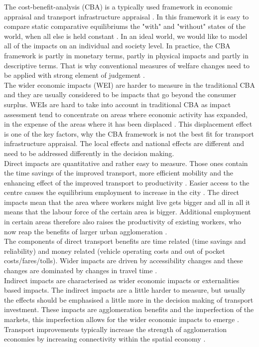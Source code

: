 The cost-benefit-analysis (CBA) is a typically used framework in economic appraisal and transport infrastructure appraisal \citep{venables2007}. In this framework it is easy to compare static comparative equilibriums the "with" and "without" states of the world, when all else is held constant \citep{mackie}. In an ideal world, we would like to model all of the impacts on an individual and society level. In practice, the CBA framework is partly in monetary terms, partly in physical impacts and partly in descriptive terms. That is why conventional measures of welfare changes need to be applied with strong element of judgement \citep{mackie}. \\

The wider economic impacts (WEI) are harder to measure in the traditional CBA and they are usually considered to be impacts that go beyond the consumer surplus. WEIs are hard to take into account in traditional CBA as impact assessment tend to concentrate on areas where economic activity has expanded, in the expense of the areas where it has been displaced \citep{venables2017}. This displacement effect is one of the key factors, why the CBA framework is not the best fit for transport infrastructure appraisal.  The local effects and national effects are different and need to be addressed differently in the decision making. \\

Direct impacts are quantitative and rather easy to measure. Those ones contain the time savings of the improved transport, more efficient mobility and the enhancing effect of the improved transport to productivity \citep{laakso}. Easier access to the centre causes the equilibrium employment to increase in the city \citep{venables2007}. The direct impacts mean that the area where workers might live gets bigger and all in all it means that the labour force of the certain area is bigger. Additional employment in certain areas therefore also raises the productivity of existing workers, who now reap the benefits of larger urban agglomeration \citep{venables2007}. \\

The components of direct transport benefits are time related (time savings and reliability) and money related (vehicle operating costs and out of pocket costs/fares/tolls). Wider impacts are driven by accessibility changes and these changes are dominated by changes in travel time \citep{mackie}. \\


Indirect impacts are characterised as wider economic impacts or externalities based impacts. The indirect impacts are a little harder to measure, but usually the effects should be emphasised a little more in the decision making of transport investment. These impacts are agglomeration benefits and the imperfection of the markets, this imperfection allows for the wider economic impacts to emerge \citep{laakso}. Transport improvements typically increase the strength of agglomeration economies by increasing connectivity within the spatial economy \citep{melo}. \\

